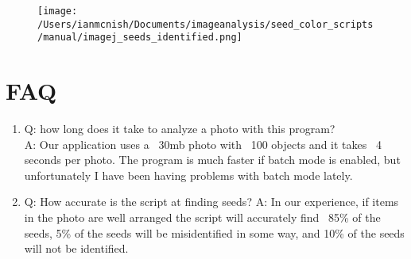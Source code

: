\documentclass[12pt]{article}
\begin{document}
\begin{figure}[H]
	\centering
	\texttt{[image: /Users/ianmcnish/Documents/imageanalysis/seed\_color\_scripts/manual/imagej\_seeds\_identified.png]}
	\label{fig:imagej_seeds_identified}
\end{figure}

\section{FAQ}\label{sec:faq}

\begin{enumerate}

\item Q: how long does it take to analyze a photo with this program?\\
\noindent A: Our application uses a ~30mb photo with ~100 objects and it takes ~4 seconds per photo. The program is much faster if batch mode is enabled, but unfortunately I have been having problems with batch mode lately.

\item Q: How accurate is the script at finding seeds?
A: In our experience, if items in the photo are well arranged the script will accurately find ~85\% of the seeds, 5\% of the seeds will be misidentified in some way, and 10\% of the seeds will not be identified.

\end{enumerate}




\printindex
\end{document}
